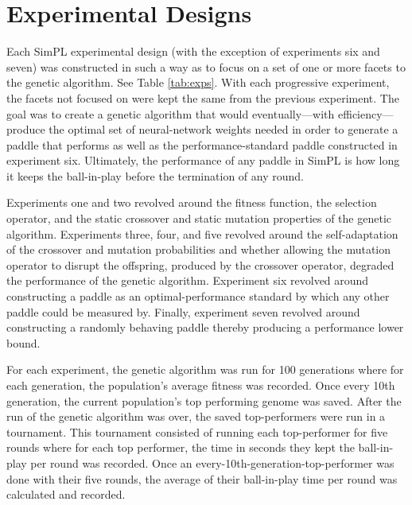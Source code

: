 \documentclass[a4paper,10pt]{article}
\begin{document}
\section{Experimental Designs}

Each SimPL experimental design (with the exception of experiments six and seven) was constructed in such a way as to focus on a set of one or more facets to the genetic algorithm. See Table \ref{tab:exps}. With each progressive experiment, the facets not focused on were kept the same from the previous experiment. The goal was to create a genetic algorithm that would eventually---with efficiency---produce the optimal set of neural-network weights needed in order to generate a paddle that performs as well as the performance-standard paddle constructed in experiment six. Ultimately, the performance of any paddle in SimPL is how long it keeps the ball-in-play before the termination of any round.       

Experiments one and two revolved around the fitness function, the selection operator, and the static crossover and static mutation properties of the genetic algorithm. Experiments three, four, and five revolved around the self-adaptation of the crossover and mutation probabilities and whether allowing the mutation operator to disrupt the offspring, produced by the crossover operator, degraded the performance of the genetic algorithm. Experiment six revolved around constructing a paddle as an optimal-performance standard by which any other paddle could be measured by. Finally, experiment seven revolved around constructing a randomly behaving paddle thereby producing a performance lower bound.

For each experiment, the genetic algorithm was run for 100 generations where for each generation, the population's average fitness was recorded. Once every 10th generation, the current population's top performing genome was saved. After the run of the genetic algorithm was over, the saved top-performers were run in a tournament. This tournament consisted of running each top-performer for five rounds where for each top performer, the time in seconds they kept the ball-in-play per round was recorded. Once an every-10th-generation-top-performer was done with their five rounds, the average of their ball-in-play time per round was calculated and recorded.   

\renewcommand*\arraystretch{1.5}
\end{document}
